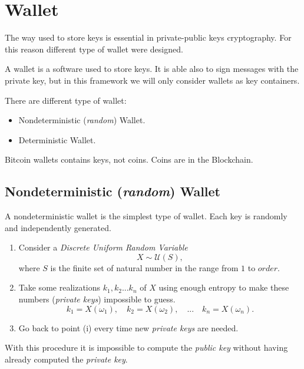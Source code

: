 \chapter{Wallet}

\label{wallet}

The way used to store keys is essential in private-public keys cryptography. For this reason different type of wallet were designed.
\begin{definition}
	A wallet is a software used to store keys. It is able also to sign messages with the private key, but in this framework we will only consider wallets as key containers. 
\end{definition}
There are different type of wallet:
\begin{itemize}
	\item Nondeterministic (\textit{random}) Wallet.
	\item Deterministic Wallet.
\end{itemize}

\begin{remark}
	Bitcoin wallets contains keys, not coins. Coins are in the Blockchain.
\end{remark}

\section{Nondeterministic (\textit{random}) Wallet}
A nondeterministic wallet is the simplest type of wallet. Each key is randomly and independently generated.

\begin{enumerate}[label=(\roman*)]
	\item Consider a \textit{Discrete Uniform Random Variable}
	\begin{equation*}
	X\sim \mathcal{U}(S),
	\end{equation*}
	where $S$ is the finite set of natural number in the range from $1$ to $order$.
	\item Take some realizations $k_1,k_2...k_n$ of $X$ using enough entropy to make these numbers (\textit{private keys}) impossible to guess.
	\begin{equation*}
	k_1=X(\omega_1), \quad  k_2=X(\omega_2), \quad ... \quad k_n=X(\omega_n).
	\end{equation*}
	\item Go back to point (i) every time new \textit{private keys} are needed.
\end{enumerate}
With this procedure it is impossible to compute the \textit{public key} without having already computed the \textit{private key}.

